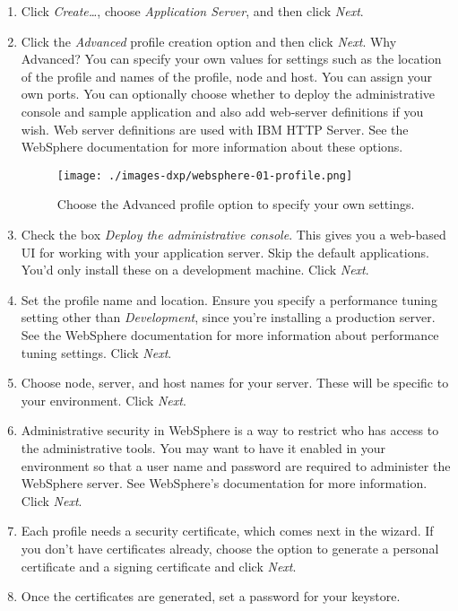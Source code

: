 \begin{enumerate}
\def\labelenumi{\arabic{enumi}.}
\item
  Click \emph{Create\ldots{}}, choose \emph{Application Server}, and
  then click \emph{Next}.
\item
  Click the \emph{Advanced} profile creation option and then click
  \emph{Next}. Why Advanced? You can specify your own values for
  settings such as the location of the profile and names of the profile,
  node and host. You can assign your own ports. You can optionally
  choose whether to deploy the administrative console and sample
  application and also add web-server definitions if you wish. Web
  server definitions are used with IBM HTTP Server. See the WebSphere
  documentation for more information about these options.

  \begin{figure}
  \centering
  \texttt{[image: ./images-dxp/websphere-01-profile.png]}
  \caption{Choose the Advanced profile option to specify your own
  settings.}
  \end{figure}
\item
  Check the box \emph{Deploy the administrative console}. This gives you
  a web-based UI for working with your application server. Skip the
  default applications. You'd only install these on a development
  machine. Click \emph{Next}.
\item
  Set the profile name and location. Ensure you specify a performance
  tuning setting other than \emph{Development}, since you're installing
  a production server. See the WebSphere documentation for more
  information about performance tuning settings. Click \emph{Next}.
\item
  Choose node, server, and host names for your server. These will be
  specific to your environment. Click \emph{Next}.
\item
  Administrative security in WebSphere is a way to restrict who has
  access to the administrative tools. You may want to have it enabled in
  your environment so that a user name and password are required to
  administer the WebSphere server. See WebSphere's documentation for
  more information. Click \emph{Next}.
\item
  Each profile needs a security certificate, which comes next in the
  wizard. If you don't have certificates already, choose the option to
  generate a personal certificate and a signing certificate and click
  \emph{Next}.
\item
  Once the certificates are generated, set a password for your keystore.

\end{enumerate}
